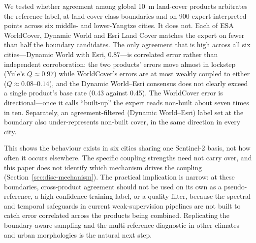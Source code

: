 \documentclass[remotesensing,article,submit,moreauthors]{Definitions/mdpi}
\begin{document}
We tested whether agreement among global 10~m land-cover products arbitrates
the reference label, at land-cover class boundaries and on 900
expert-interpreted points across six middle- and lower-Yangtze cities. It does not. Each of
ESA WorldCover, Dynamic World and Esri Land Cover matches the expert on fewer
than half the boundary candidates. The only agreement that is high across all
six cities---Dynamic World with Esri, 0.87---is correlated error rather than
independent corroboration: the two products' errors move almost in lockstep
(Yule's $Q \approx 0.97$) while WorldCover's errors are at most weakly coupled
to either ($Q \approx 0.08$--$0.14$), and the Dynamic World--Esri consensus does not clearly exceed a
single product's base rate (0.43 against 0.45). The WorldCover error is
directional---once it calls ``built-up'' the expert reads non-built about
seven times in ten. Separately, an agreement-filtered (Dynamic World--Esri)
label set at the boundary also under-represents non-built cover, in the same
direction in every city.

This shows the behaviour exists in six cities sharing one
Sentinel-2 basis, not how
often it occurs elsewhere. The specific coupling
strengths need not carry over, and this paper does not identify which
mechanism drives the coupling (Section~\ref{sec:disc-mechanism}). The practical implication is
narrow: at these boundaries, cross-product agreement should not be used on its own
as a pseudo-reference, a high-confidence training label, or a quality filter,
because the spectral and temporal safeguards in current weak-supervision
pipelines are not built to catch error correlated across the products being
combined. Replicating the boundary-aware sampling and the multi-reference
diagnostic in other climates and urban morphologies is the natural next step.


\end{document}
